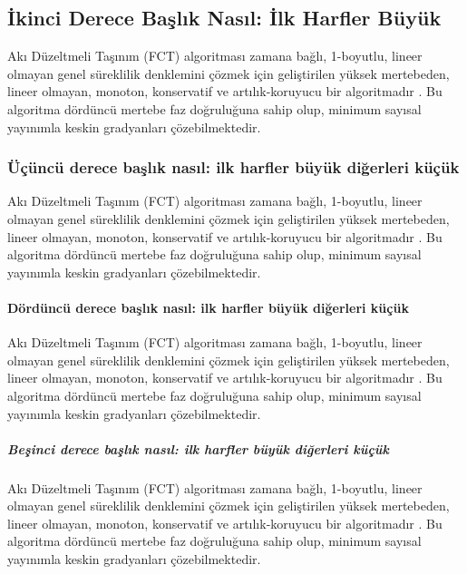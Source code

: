 \documentclass[a4paper, 12pt, oneside]{Etuthesis}
\begin{document}
{\subsection{İkinci Derece Başlık Nasıl: İlk Harfler Büyük}

Akı Düzeltmeli Taşınım (FCT) algoritması zamana bağlı, 1-boyutlu, lineer olmayan genel süreklilik denklemini çözmek için geliştirilen yüksek mertebeden, lineer olmayan, monoton, konservatif ve artılık-koruyucu bir algoritmadır . Bu algoritma dördüncü mertebe faz doğruluğuna sahip olup, minimum sayısal yayınımla keskin gradyanları çözebilmektedir.

\subsubsection{Üçüncü derece başlık nasıl: ilk harfler büyük diğerleri küçük}

Akı Düzeltmeli Taşınım (FCT) algoritması zamana bağlı, 1-boyutlu, lineer olmayan genel süreklilik denklemini çözmek için geliştirilen yüksek mertebeden, lineer olmayan, monoton, konservatif ve artılık-koruyucu bir algoritmadır . Bu algoritma dördüncü mertebe faz doğruluğuna sahip olup, minimum sayısal yayınımla keskin gradyanları çözebilmektedir.

\paragraph{Dördüncü derece başlık nasıl: ilk harfler büyük diğerleri küçük}

Akı Düzeltmeli Taşınım (FCT) algoritması zamana bağlı, 1-boyutlu, lineer olmayan genel süreklilik denklemini çözmek için geliştirilen yüksek mertebeden, lineer olmayan, monoton, konservatif ve artılık-koruyucu bir algoritmadır . Bu algoritma dördüncü mertebe faz doğruluğuna sahip olup, minimum sayısal yayınımla keskin gradyanları çözebilmektedir.

\subparagraph{Beşinci derece başlık nasıl: ilk harfler büyük diğerleri küçük}

Akı Düzeltmeli Taşınım (FCT) algoritması zamana bağlı, 1-boyutlu, lineer olmayan genel süreklilik denklemini çözmek için geliştirilen yüksek mertebeden, lineer olmayan, monoton, konservatif ve artılık-koruyucu bir algoritmadır . Bu algoritma dördüncü mertebe faz doğruluğuna sahip olup, minimum sayısal yayınımla keskin gradyanları çözebilmektedir.

}
\end{document}
